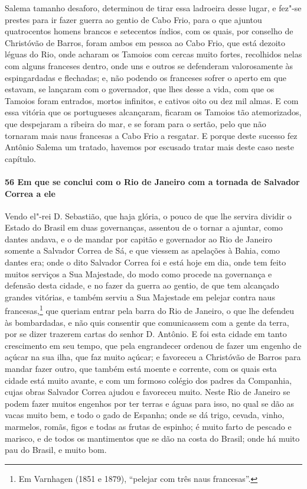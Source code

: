 \begin{linenumbers}
Salema tamanho desaforo, determinou de tirar essa ladroeira desse lugar, e fez"-se prestes
para ir fazer guerra ao gentio de Cabo Frio, para o que ajuntou quatrocentos homens
brancos e setecentos índios, com os quais, por conselho de Christóvão de Barros, foram
ambos em pessoa ao Cabo Frio, que está dezoito léguas do Rio, onde acharam os Tamoios com
cercas muito fortes, recolhidos nelas com alguns franceses dentro, onde uns e outros se
defenderam valorosamente às espingardadas e flechadas; e, não podendo os franceses sofrer
o aperto em que estavam, se lançaram com o governador, que lhes desse a vida, com que os
Tamoios foram entrados, mortos infinitos, e cativos oito ou dez mil almas. E com essa
vitória que os portugueses alcançaram, ficaram os Tamoios tão atemorizados, que despejaram
a ribeira do mar, e se foram para o sertão, pelo que não tornaram mais naus francesas a
Cabo Frio a resgatar. E porque deste sucesso fez Antônio Salema um tratado, havemos por
escusado tratar mais deste caso neste capítulo.

\paragraph{56 Em que se conclui com o Rio de Janeiro com a tornada de Salvador Correa a
ele} \quad
Vendo el"-rei D. Sebastião, que haja glória, o pouco de que lhe servira dividir o Estado do
Brasil em duas governanças, assentou de o tornar a ajuntar, como dantes andava, e o de
mandar por capitão e governador ao Rio de Janeiro somente a Salvador Correa de Sá, e que
viessem as apelações à Bahia, como dantes era; onde o dito Salvador Correa foi e está hoje
em dia, onde tem feito muitos serviços a Sua Majestade, do modo como procede na governança
e defensão desta cidade, e no fazer da guerra ao gentio, de que tem alcançado grandes
vitórias, e também serviu a Sua Majestade em pelejar contra naus francesas,\footnote{ Em
Varnhagen (1851 e 1879), ``pelejar com três naus francesas''.} que queriam entrar pela
barra do Rio de Janeiro, o que lhe defendeu às bombardadas, e não quis consentir que
comunicassem com a gente da terra, por se dizer trazerem cartas do senhor D. Antônio. E
foi esta cidade em tanto crescimento em seu tempo, que pela engrandecer ordenou de fazer
um engenho de açúcar na sua ilha, que faz muito açúcar; e favoreceu a Christóvão de Barros
para mandar fazer outro, que também está moente e corrente, com os quais esta cidade está
muito avante, e com um formoso colégio dos padres da Companhia, cujas obras Salvador
Correa ajudou e favoreceu muito. Neste Rio de Janeiro se podem fazer muitos engenhos por
ter terras e águas para isso, no qual se dão as vacas muito bem, e todo o gado de Espanha;
onde se dá trigo, cevada, vinho, marmelos, romãs, figos e todas as frutas de espinho; é
muito farto de pescado e marisco, e de todos os mantimentos que se dão na costa do Brasil;
onde há muito pau do Brasil, e muito bom.


\end{linenumbers}
